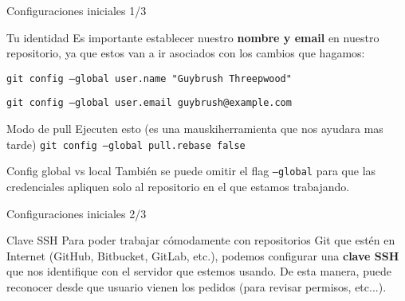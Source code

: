 \begin{frame}[fragile]{Configuraciones iniciales 1/3}

    \begin{block}{Tu identidad}
        Es importante establecer nuestro \textbf{nombre y email} en nuestro repositorio, ya que estos van a ir asociados con los cambios que hagamos:

        \vspace{0.5em}

        \texttt{git config --global user.name "Guybrush Threepwood"}

        \texttt{git config --global user.email guybrush@example.com}
    \end{block}

    \begin{block}{Modo de pull}
        Ejecuten esto (es una mauskiherramienta que nos ayudara mas tarde)
        \texttt{git config --global pull.rebase false}
    \end{block}

    \begin{block}{Config global vs local}
    También se puede omitir el flag \texttt{--global} para que las credenciales apliquen solo al repositorio en el que estamos trabajando.
    \end{block}

\end{frame}
\begin{frame}[fragile]{Configuraciones iniciales 2/3}

	\begin{block}{Clave SSH}
		Para poder trabajar cómodamente con repositorios Git que estén en Internet (GitHub, Bitbucket, GitLab, etc.), podemos configurar una \textbf{clave SSH} que nos identifique con el servidor que estemos usando. De esta manera, puede reconocer desde que usuario vienen los pedidos (para revisar permisos, etc...).

	\end{block}
\end{frame}

